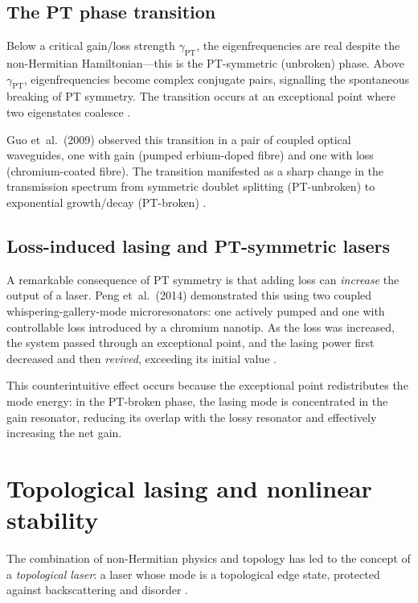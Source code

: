 \subsection{The PT phase transition}
\label{sec:ch17-pt-transition}

Below a critical gain/loss strength $\gamma_{\mathrm{PT}}$, the
eigenfrequencies are real despite the non-Hermitian Hamiltonian---this
is the PT-symmetric (unbroken) phase.  Above $\gamma_{\mathrm{PT}}$,
eigenfrequencies become complex conjugate pairs, signalling the
spontaneous breaking of PT symmetry.  The transition occurs at an
exceptional point where two eigenstates coalesce
\cite{guo2009observation,peng2014loss}.

Guo et~al.\ (2009) observed this transition in a pair of coupled
optical waveguides, one with gain (pumped erbium-doped fibre) and one
with loss (chromium-coated fibre).  The transition manifested as a
sharp change in the transmission spectrum from symmetric doublet
splitting (PT-unbroken) to exponential growth/decay
(PT-broken) \cite{guo2009observation}.

\subsection{Loss-induced lasing and PT-symmetric lasers}
\label{sec:ch17-pt-laser}

A remarkable consequence of PT symmetry is that adding loss can
\emph{increase} the output of a laser.  Peng et~al.\ (2014)
demonstrated this using two coupled whispering-gallery-mode
microresonators: one actively pumped and one with controllable loss
introduced by a chromium nanotip.  As the loss was increased, the
system passed through an exceptional point, and the lasing power
first decreased and then \emph{revived}, exceeding its initial value
\cite{peng2014loss}.

This counterintuitive effect occurs because the exceptional point
redistributes the mode energy: in the PT-broken phase, the lasing
mode is concentrated in the gain resonator, reducing its overlap with
the lossy resonator and effectively increasing the net gain.

\section{Topological lasing and nonlinear stability}
\label{sec:ch17-topological-laser}

The combination of non-Hermitian physics and topology has led to the
concept of a \emph{topological laser}: a laser whose mode is a
topological edge state, protected against backscattering and disorder \cite{elganainy2018non}.

